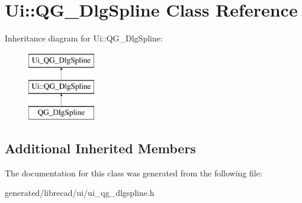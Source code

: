 \hypertarget{classUi_1_1QG__DlgSpline}{\section{Ui\-:\-:Q\-G\-\_\-\-Dlg\-Spline Class Reference}
\label{classUi_1_1QG__DlgSpline}
}
Inheritance diagram for Ui\-:\-:Q\-G\-\_\-\-Dlg\-Spline\-:\begin{figure}[H]
\begin{center}
\leavevmode
\includegraphics[height=3.000000cm]{classUi_1_1QG__DlgSpline}
\end{center}
\end{figure}
\subsection*{Additional Inherited Members}


The documentation for this class was generated from the following file\-:\begin{DoxyCompactItemize}
\item 
generated/librecad/ui/ui\-\_\-qg\-\_\-dlgspline.\-h\end{DoxyCompactItemize}
